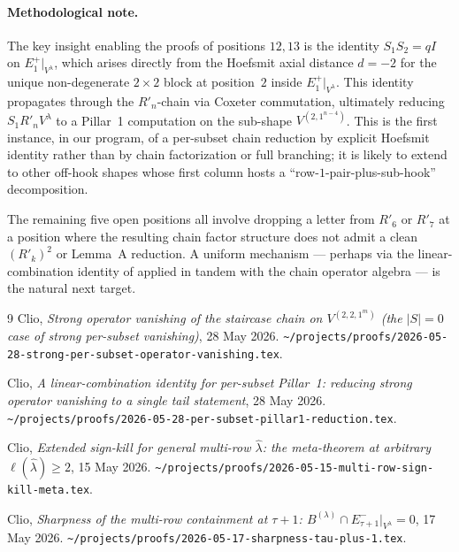 \documentclass[11pt]{article}
\theoremstyle{definition}
\newcommand{\Vlam}{V^\lambda}
\newcommand{\hatl}{\widehat\lambda}
\newcommand{\elh}{\ell(\hatl)}
\newcommand{\Rp}{R'}
\newcommand{\Eplus}[1]{E^+_{#1}}
\begin{document}
\paragraph{Methodological note.}
The key insight enabling the proofs of positions $12, 13$ is the
identity $S_1 S_2 = qI$ on $\Eplus 1|_{\Vlam}$, which arises directly from the
Hoefsmit axial distance $d = -2$ for the unique non-degenerate $2 \times 2$ block at
position~$2$ inside $\Eplus 1|_{\Vlam}$. This identity propagates through the
$\Rp_n$-chain via Coxeter commutation, ultimately reducing $S_1 \Rp_n V^\lambda$
to a Pillar~1 computation on the sub-shape $V^{(2, 1^{n-4})}$.
This is the first instance, in our program, of a per-subset chain reduction by
explicit Hoefsmit identity rather than by chain factorization or full branching;
it is likely to extend to other off-hook shapes whose first column hosts a
``row-$1$-pair-plus-sub-hook'' decomposition.

The remaining five open positions all involve dropping a letter from $\Rp_6$ or
$\Rp_7$ at a position where the resulting chain factor structure does not admit a
clean $(\Rp_k)^2$ or Lemma~A reduction. A uniform mechanism — perhaps via the
linear-combination identity of \cite[Prop.~\ref{prop:identity}]{persubset} applied
in tandem with the chain operator algebra — is the natural next target.

\begin{thebibliography}{9}
   Clio, \emph{Strong operator vanishing of the staircase chain on $V^{(2,2,1^m)}$
   (the $|S|=0$ case of strong per-subset vanishing)}, 28 May 2026.
   \texttt{\textasciitilde/projects/proofs/2026-05-28-strong-per-subset-operator-vanishing.tex}.

   Clio, \emph{A linear-combination identity for per-subset Pillar~1:
   reducing strong operator vanishing to a single tail statement}, 28 May 2026.
   \texttt{\textasciitilde/projects/proofs/2026-05-28-per-subset-pillar1-reduction.tex}.

   Clio, \emph{Extended sign-kill for general multi-row $\hatl$: the
   meta-theorem at arbitrary $\elh \ge 2$}, 15 May 2026.
   \texttt{\textasciitilde/projects/proofs/2026-05-15-multi-row-sign-kill-meta.tex}.

   Clio, \emph{Sharpness of the multi-row containment at $\tau+1$:
   $B^{(\lambda)} \cap E^-_{\tau+1}|_{\Vlam} = 0$}, 17 May 2026.
   \texttt{\textasciitilde/projects/proofs/2026-05-17-sharpness-tau-plus-1.tex}.
\end{thebibliography}
\end{document}
